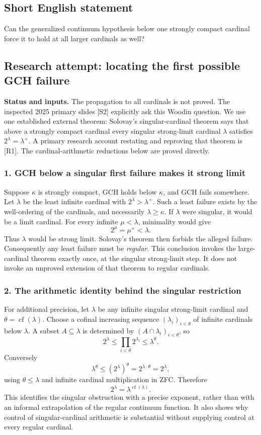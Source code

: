 \documentclass[11pt,a4paper]{article}
\begin{document}
\subsection{Short English statement}

Can the generalized continuum hypothesis below one strongly compact cardinal force it to hold at all larger cardinals as well?

\subsection{Research attempt: locating the first possible GCH failure}
\textbf{Status and inputs.} The propagation to all cardinals is not proved. The inspected 2025 primary slides [S2] explicitly ask this Woodin question. We use one established external theorem: Solovay's singular-cardinal theorem says that above a strongly compact cardinal every singular strong-limit cardinal $\lambda$ satisfies $2^\lambda=\lambda^+$. A primary research account restating and reproving that theorem is [R1]. The cardinal-arithmetic reductions below are proved directly.

\subsubsection{1. GCH below a singular first failure makes it strong limit}
Suppose $\kappa$ is strongly compact, GCH holds below $\kappa$, and GCH fails somewhere. Let $\lambda$ be the least infinite cardinal with $2^\lambda>\lambda^+$. Such a least failure exists by the well-ordering of the cardinals, and necessarily $\lambda\geq\kappa$. If $\lambda$ were singular, it would be a limit cardinal. For every infinite $\mu<\lambda$, minimality would give
\[2^\mu=\mu^+<\lambda.\]
Thus $\lambda$ would be strong limit. Solovay's theorem then forbids the alleged failure. Consequently any least failure must be \emph{regular}. This conclusion invokes the large-cardinal theorem exactly once, at the singular strong-limit step. It does not invoke an unproved extension of that theorem to regular cardinals.

\subsubsection{2. The arithmetic identity behind the singular restriction}
For additional precision, let $\lambda$ be any infinite singular strong-limit cardinal and $\theta=\operatorname{cf}(\lambda)$. Choose a cofinal increasing sequence $(\lambda_i)_{i<\theta}$ of infinite cardinals below $\lambda$. A subset $A\subseteq\lambda$ is determined by $(A\cap\lambda_i)_{i<\theta}$, so
\[2^\lambda\leq\prod_{i<\theta}2^{\lambda_i}\leq\lambda^\theta.
\]
Conversely
\[\lambda^\theta\leq(2^\lambda)^\theta
=2^{\lambda\cdot\theta}=2^\lambda,
\]
using $\theta\leq\lambda$ and infinite cardinal multiplication in ZFC. Therefore
\[2^\lambda=\lambda^{\operatorname{cf}(\lambda)}.\tag{1}\]
This identifies the singular obstruction with a precise exponent, rather than with an informal extrapolation of the regular continuum function. It also shows why control of singular-cardinal arithmetic is substantial without supplying control at every regular cardinal.
\end{document}
